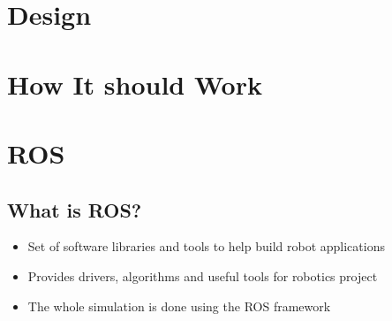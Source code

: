 \documentclass[a0,portrait]{a0poster}
\begin{document}
\begin{multicols}{2}
\section*{Design}
\begin{center}\vspace{1cm}
\end{center}%


\color{Black} %

\section*{How It should Work}

\begin{center}\vspace{1cm}
\end{center}
\vspace{1cm}

\section*{ROS}
\subsection*{What is ROS?}
\begin{itemize}
\item Set of software libraries and tools to help build robot applications
\item Provides drivers, algorithms and useful tools for robotics project
\item The whole simulation is done using the ROS framework
\end{itemize}

\end{multicols}
\end{document}
